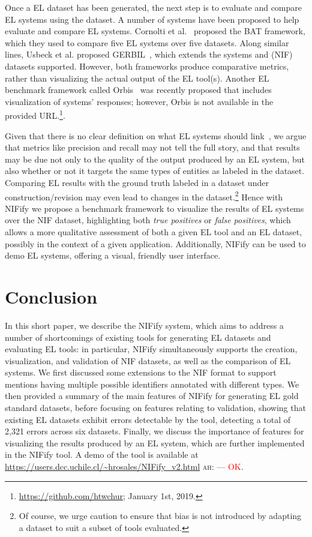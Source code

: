 \documentclass[sigconf]{acmart}
\newcommand{\ah}[1]{{\color{blue}\textsc{ah:} #1}}
\begin{document}
Once a EL dataset has been generated, the next step is to evaluate and compare EL systems using the dataset. A number of systems have been proposed to help evaluate and compare EL systems. Cornolti et al.~\cite{BAT2013} proposed the BAT framework, which they used to compare five EL systems over five datasets. Along similar lines, Usbeck et al. proposed GERBIL~\cite{gerbil-2015}, which extends the systems and (NIF) datasets supported. However, both frameworks produce comparative metrics, rather than visualizing the actual output of the EL tool(s). Another EL benchmark framework called Orbis~\cite{Orbis2018} was recently proposed that includes visualization of systems' responses; however, Orbis is not available in the provided URL.\footnote{\url{https://github.com/htwchur}; January 1st, 2019.}. 

Given that there is no clear definition on what EL systems should link~\cite{ourAMW2018}, we argue that metrics like precision and recall may not tell the full story, and that results may be due not only to the quality of the output produced by an EL system, but also whether or not it targets the same types of entities as labeled in the dataset. Comparing EL results with the ground truth labeled in a dataset under construction/revision may even lead to changes in the dataset.\footnote{Of course, we urge caution to ensure that bias is not introduced by adapting a dataset to suit a subset of tools evaluated.} Hence with NIFify we propose a benchmark framework to visualize the results of EL systems over the NIF dataset, highlighting both \textit{true positives} or \textit{false positives}, which allows a more qualitative assessment of both a given EL tool and an EL dataset, possibly in the context of a given application. Additionally, NIFify can be used to demo EL systems, offering a visual, friendly user interface.


\section{Conclusion} 
\label{sec:conclusion}
In this short paper, we describe the NIFify system, which aims to address a number of shortcomings of existing tools for generating EL datasets and evaluating EL tools: in particular, NIFify simultaneously supports the creation, visualization, and validation of NIF datasets, as well as the comparison of EL systems. We first discussed some extensions to the NIF format to support mentions having multiple possible identifiers annotated with different types. We then provided a summary of the main features of NIFify for generating EL gold standard datasets, before focusing on features relating to validation, showing that existing EL datasets exhibit errors detectable by the tool, detecting a total of 2,321 errors across six datasets. Finally, we discuss the importance of features for visualizing the results produced by an EL system, which are further implemented in the NIFify tool. A demo of the tool is available at \url{https://users.dcc.uchile.cl/~hrosales/NIFify\_v2.html} \ah{---} \textcolor{red}{OK}. 
\end{document}
